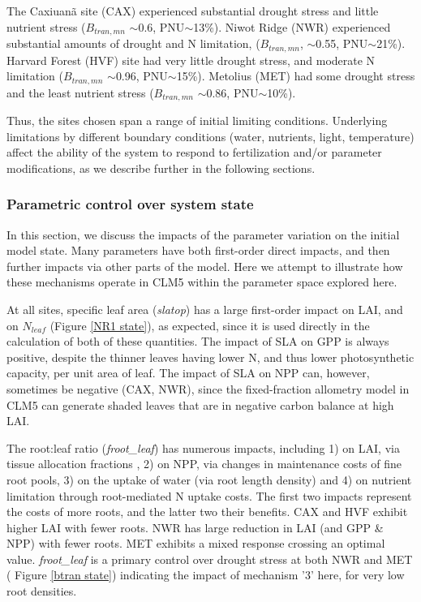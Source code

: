 \usepackage{}\documentclass[draft,linenumbers]{agujournal}
\begin{document}
The Caxiuan\~a site (CAX) experienced substantial drought stress and little nutrient stress ($B_{tran,mn}$ $\sim$0.6, PNU$\sim$13\%). Niwot Ridge (NWR) experienced substantial amounts of drought and N limitation, ($B_{tran,mn}$, $\sim$0.55, PNU$\sim$21\%). Harvard Forest (HVF) site had very little drought stress, and moderate N limitation ($B_{tran,mn}$ $\sim$0.96, PNU$\sim$15\%).  Metolius (MET)  had some drought stress and the least nutrient stress ($B_{tran,mn}$ $\sim$0.86, PNU$\sim$10\%).  

Thus, the sites chosen span a range of initial limiting conditions. Underlying limitations by different boundary conditions (water, nutrients, light, temperature) affect the ability of the system to respond to fertilization and/or parameter modifications, as we describe further in the following sections. 

\subsubsection{Parametric control over system state}
In this section, we discuss the impacts of the parameter variation on the initial model state.  Many parameters have both first-order direct impacts, and then further impacts via other parts of the model. Here we attempt to illustrate how these mechanisms operate in CLM5 within the parameter space explored here. 

At all sites, specific leaf area (\emph{slatop}) has a large first-order impact on LAI, and on $N_{leaf}$ (Figure \ref{NR1 state}), as expected, since it is used directly in the calculation of both of these quantities. The impact of SLA on GPP is always positive, despite the thinner leaves having lower N, and thus lower photosynthetic capacity, per unit area of leaf. The impact of SLA on NPP can, however, sometimes be negative (CAX, NWR), since the fixed-fraction allometry model in CLM5 can generate shaded leaves that are in negative carbon balance at high LAI. 

The root:leaf ratio (\emph{froot\_leaf}) has numerous impacts, including 1) on LAI, via tissue allocation fractions , 2) on NPP, via changes in maintenance costs of fine root pools, 3) on the uptake of water (via root length density) and 4) on nutrient limitation through root-mediated N uptake costs. The first two impacts represent the costs of more roots, and the latter two their benefits. CAX and HVF exhibit higher LAI with fewer roots. NWR has large reduction in LAI (and GPP \& NPP) with fewer roots. MET exhibits a mixed response crossing an optimal value. \emph{froot\_leaf} is a primary control over drought stress at both NWR and MET ( Figure \ref{btran state}) indicating the impact of mechanism '3' here, for very low root densities.
\end{document}
